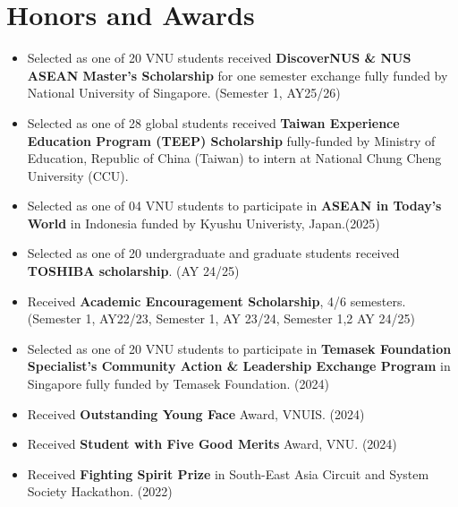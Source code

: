 \documentclass[letterpaper,9pt]{extarticle}
\begin{document}
\section{Honors and Awards}
\begin{itemize}
\item Selected as one of 20 VNU students received \textbf{DiscoverNUS \& NUS ASEAN Master's Scholarship} for one semester exchange fully funded by National University of Singapore. (Semester 1, AY25/26)
\item Selected as one of 28 global students received \textbf{Taiwan Experience Education Program (TEEP) Scholarship} fully-funded by Ministry of Education, Republic of China (Taiwan) to intern at National Chung Cheng University (CCU).
\item Selected as one of 04 VNU students to participate in \textbf{ASEAN in Today's World} in Indonesia funded by Kyushu Univeristy, Japan.(2025)
\item Selected as one of 20 undergraduate and graduate students received \textbf{TOSHIBA scholarship}. (AY 24/25)
\item Received \textbf{Academic Encouragement Scholarship}, 4/6 semesters.(Semester 1, AY22/23, Semester 1, AY 23/24, Semester 1,2 AY 24/25)
\item Selected as one of 20 VNU students to participate in \textbf{Temasek Foundation Specialist's Community Action \& Leadership Exchange Program} in Singapore fully funded by Temasek Foundation. (2024)
\item Received \textbf{Outstanding Young Face} Award, VNUIS. (2024)
\item Received \textbf{Student with Five Good Merits} Award, VNU. (2024)
\item Received \textbf{Fighting Spirit Prize} in South-East Asia Circuit and System Society Hackathon. (2022)
\end{itemize}
\end{document}
